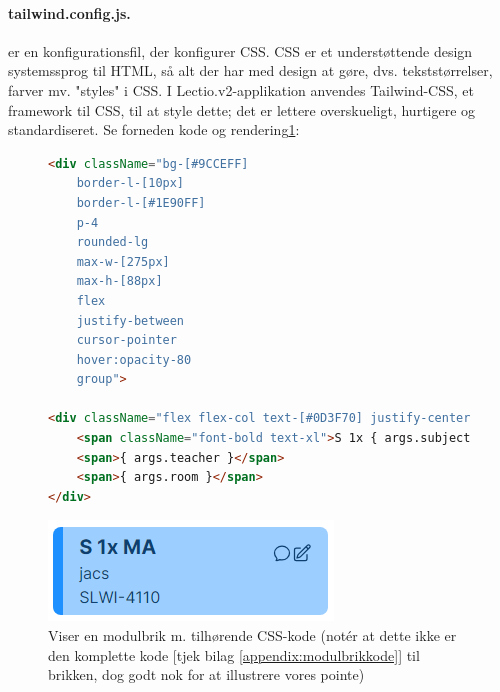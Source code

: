         \paragraph{tailwind.config.js. \label{par:tailwind}} er en konfigurationsfil, der konfigurer CSS. CSS er et understøttende design systemssprog til HTML, så alt der har med design at gøre, dvs. tekststørrelser, farver mv. "styles" i CSS. I Lectio.v2-applikation anvendes Tailwind-CSS, et framework til CSS, til at style dette; det er lettere overskueligt, hurtigere og standardiseret. Se forneden kode og rendering\ref{fig:modulbrikfostaaelse}:
        \begin{figure}[H]
            \begin{lstlisting}[language=HTML]
<div className="bg-[#9CCEFF] 
    border-l-[10px] 
    border-l-[#1E90FF] 
    p-4 
    rounded-lg 
    max-w-[275px] 
    max-h-[88px] 
    flex 
    justify-between 
    cursor-pointer 
    hover:opacity-80 
    group">

<div className="flex flex-col text-[#0D3F70] justify-center">
    <span className="font-bold text-xl">S 1x { args.subject }</span>
    <span>{ args.teacher }</span>
    <span>{ args.room }</span>
</div>    
            \end{lstlisting}
            \begin{center}
            \includegraphics{assets/moduleElement.png}
            \end{center}
            \caption{Viser en modulbrik m. tilhørende CSS-kode (notér at dette ikke er den komplette kode [tjek bilag \ref{appendix:modulbrikkode}] til brikken, dog godt nok for at illustrere vores pointe) \label{fig:modulbrikfostaaelse}}
        \end{figure}
